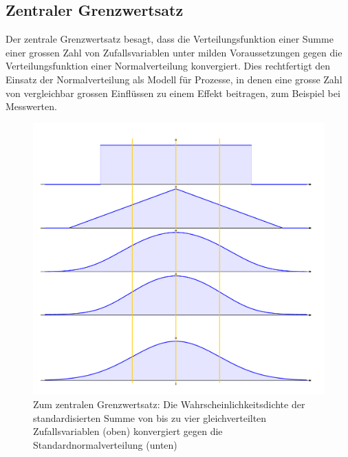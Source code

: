 \documentclass[../Main.tex]{subfiles}
\begin{document}
\subsection{Zentraler Grenzwertsatz}
Der zentrale Grenzwertsatz besagt, dass die Verteilungsfunktion einer Summe einer grossen Zahl 
von Zufallsvariablen unter milden Voraussetzungen gegen die Verteilungsfunktion einer Normalverteilung konvergiert. 
Dies rechtfertigt den Einsatz der Normalverteilung als Modell für Prozesse, in denen eine grosse Zahl 
von vergleichbar grossen Einflüssen zu einem Effekt beitragen, zum Beispiel bei Messwerten.

\begin{figure}[H]
    \centering
    \includegraphics[width=0.75\linewidth]{Images/central-limit.png}
    \caption{Zum zentralen Grenzwertsatz: Die Wahrscheinlichkeitsdichte der standardisierten Summe von
    bis zu vier gleichverteilten Zufallsvariablen (oben) konvergiert gegen die Standardnormalverteilung (unten)}
\end{figure}
\end{document}
